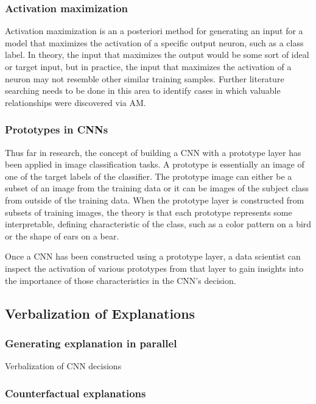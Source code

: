 \subsubsection{Activation maximization}

Activation maximization is an a posteriori method for generating an input for a model that maximizes the activation of a specific output neuron\cite{Nguyen2016}, such as a class label.  In theory, the input that maximizes the output would be some sort of ideal or target input, but in practice, the input that maximizes the activation of a neuron may not resemble other similar training samples.  Further literature searching needs to be done in this area to identify cases in which valuable relationships were discovered via AM.

\subsubsection{Prototypes in CNNs}

Thus far in research, the concept of building a CNN with a prototype layer has been applied in image classification tasks.  A prototype is essentially an image of one of the target labels of the classifier.  The prototype image can either be a subset of an image from the training data or it can be images of the subject class from outside of the training data.  When the prototype layer is constructed from subsets of training images, the theory is that each prototype represents some interpretable, defining characteristic of the class, such as a color pattern on a bird or the shape of ears on a bear.

Once a CNN has been constructed using a prototype layer, a data scientist can inspect the activation of various prototypes from that layer to gain insights into the importance of those characteristics in the CNN's decision.

\subsection{Verbalization of Explanations}

\subsubsection{Generating explanation in parallel}

Verbalization of CNN decisions \cite{10.1007/978-3-319-46493-0_1}

\subsubsection{Counterfactual explanations}

